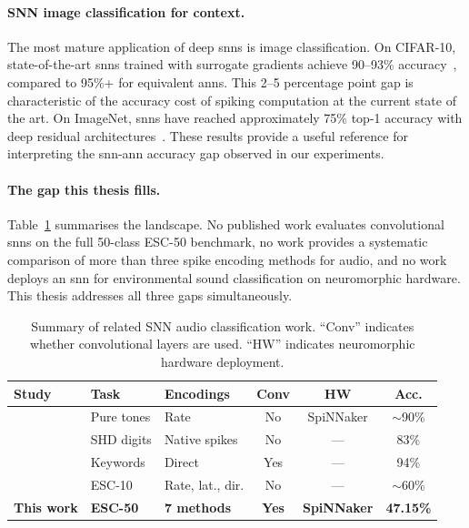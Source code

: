 \paragraph{SNN image classification for context.}
The most mature application of deep \glspl{snn} is image classification. On CIFAR-10, state-of-the-art \glspl{snn} trained with surrogate gradients achieve 90--93\% accuracy~\citep{fang2021,zheng2021}, compared to 95\%+ for equivalent \glspl{ann}. This 2--5 percentage point gap is characteristic of the accuracy cost of spiking computation at the current state of the art. On ImageNet, \glspl{snn} have reached approximately 75\% top-1 accuracy with deep residual architectures~\citep{hu2024}. These results provide a useful reference for interpreting the \gls{snn}-\gls{ann} accuracy gap observed in our experiments.

\paragraph{The gap this thesis fills.}
Table~\ref{tab:related-work} summarises the landscape. No published work evaluates convolutional \glspl{snn} on the full 50-class ESC-50 benchmark, no work provides a systematic comparison of more than three spike encoding methods for audio, and no work deploys an \gls{snn} for environmental sound classification on neuromorphic hardware. This thesis addresses all three gaps simultaneously.

\begin{table}[t]
    \centering
    \caption{Summary of related SNN audio classification work. ``Conv'' indicates whether convolutional layers are used. ``HW'' indicates neuromorphic hardware deployment.}
    \label{tab:related-work}
    \small
    \begin{tabular}{@{}lllccc@{}}
        \toprule
        \textbf{Study} & \textbf{Task} & \textbf{Encodings} & \textbf{Conv} & \textbf{HW} & \textbf{Acc.} \\
        \midrule
        \citet{dominguezmorales2016} & Pure tones & Rate & No & SpiNNaker & $\sim$90\% \\
        \citet{cramer2020}           & SHD digits & Native spikes & No & --- & 83\% \\
        \citet{pellegrini2021}       & Keywords   & Direct & Yes & --- & 94\% \\
        \citet{larroza2025}          & ESC-10     & Rate, lat., dir. & No & --- & $\sim$60\% \\
        \midrule
        \textbf{This work}           & \textbf{ESC-50} & \textbf{7 methods} & \textbf{Yes} & \textbf{SpiNNaker} & \textbf{47.15\%} \\
        \bottomrule
    \end{tabular}
\end{table}


